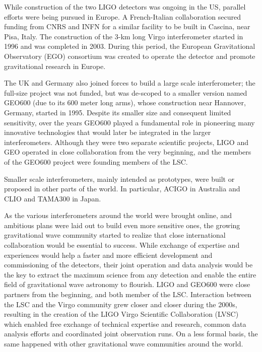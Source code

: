 While construction of the two LIGO detectors was ongoing in the US, parallel efforts 
were being pursued in Europe. A French-Italian collaboration secured funding from CNRS and INFN for a 
similar facility to be built in Cascina, near Pisa, Italy.
The construction of the 3-km long Virgo interferometer started in 1996 and was completed in 2003.
During this period, the European Gravitational Observatory (EGO) consortium was created to operate the detector 
and promote gravitational research in Europe.

The UK and Germany also joined forces to build a large scale interferometer; the full-size project was not funded, but was de-scoped to a smaller version named GEO600 (due to its 600 meter long arms), 
whose construction near Hannover, Germany, started in 1995. Despite its smaller size and consequent limited sensitivity, over the years GEO600 played a fundamental role in pioneering many innovative technologies that would later be integrated in the larger interferometers.
Although they were two separate scientific projects, LIGO and GEO operated in close collaboration from the very beginning, and the members of the GEO600 project were founding members of the LSC.

Smaller scale interferometers, mainly intended as prototypes, were built or 
proposed in other parts of the world. In particular, ACIGO in Australia and 
CLIO and TAMA300 in Japan. 

As the various interferometers around the world were brought online, and ambitious plans were laid out to build even more sensitive ones, the growing gravitational wave community started to realize that close international collaboration would be essential to success.
While exchange of expertise and experiences would help a faster and more efficient development and commissioning of the detectors, their joint operation and data analysis would be the key to extract the maximum science from any detection and enable the entire field of gravitational wave astronomy to flourish.
LIGO and GEO600 were close partners from the beginning, and both member of the LSC. Interaction between the LSC and the Virgo community grew closer and closer during the 2000s, resulting in the creation of the LIGO Virgo Scientific Collaboration (LVSC) which enabled free exchange of technical expertise and research, common data analysis efforts and coordinated joint observation runs.
On a less formal basis, the same happened with other gravitational wave communities around the world.